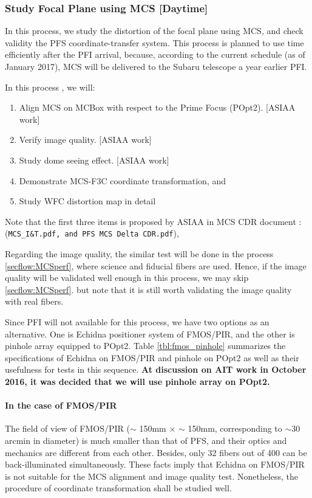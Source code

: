 \subsubsection{Study Focal Plane using MCS [Daytime]}\label{secflow:prestudy}
In this process, we study the distortion of the focal plane using MCS, and check validity the PFS coordinate-transfer system.
This process is planned to use time efficiently after the PFI arrival, because, according to the current schedule (as of January 2017), MCS will be delivered to the Subaru telescope a year earlier PFI.

In this process , we will:
\begin{enumerate}
\item Align MCS on MCBox with respect to the Prime Focus (POpt2). [ASIAA work]
\item Verify image quality. [ASIAA work]
\item Study dome seeing effect. [ASIAA work]
\item Demonstrate MCS-F3C coordinate transformation, and
\item Study WFC distortion map in detail
\end{enumerate}
Note that the first three items is proposed by ASIAA in MCS CDR document : ({\tt MCS\_I\&T.pdf, and PFS MCS Delta CDR.pdf}),

Regarding the image quality, the similar test will be done in the process \ref{secflow:MCSperf}, where science and fiducial fibers are used.
Hence, if the image quality will be validated well enough in this process, we may skip \ref{secflow:MCSperf}.
but note that it is still worth validating the image quality with real fibers.

Since PFI will not available for this process, we have two options as an alternative.
One is Echidna positioner system of FMOS/PIR, and the other is pinhole array equipped to POpt2.
Table \ref{tbl:fmos_pinhole} summarizes the specifications of Echidna on FMOS/PIR and pinhole on POpt2 as well as their usefulness for tests in this sequence. 
{\bf At discussion on AIT work in October 2016, it was decided that we will use pinhole array on POpt2. }

\paragraph{In the case of FMOS/PIR}
The field of view of FMOS/PIR ($\sim$ 150mm $\times$ $\sim$ 150mm, corresponding to $\sim 30$ arcmin in diameter) is much smaller than that of PFS, and their optics and mechanics are different from each other.
Besides, only 32 fibers out of 400 can be back-illuminated simultaneously.
These facts imply that Echidna on FMOS/PIR is not suitable for the MCS alignment and image quality test.
Nonetheless, the procedure of coordinate transformation shall be studied well.

